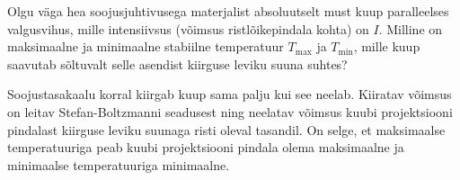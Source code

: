 
Olgu väga hea soojusjuhtivusega materjalist absoluutselt must kuup paralleelses valgusvihus, mille intensiivsus (võimsus ristlõikepindala kohta) on $I$. Milline on maksimaalne ja minimaalne stabiilne temperatuur $T_\text{max}$ ja $T_\text{min}$, mille kuup saavutab sõltuvalt selle asendist kiirguse leviku suuna suhtes?

\hint
Soojustasakaalu korral kiirgab kuup sama palju kui see neelab. Kiiratav võimsus on leitav Stefan-Boltzmanni seadusest ning neelatav võimsus kuubi projektsiooni pindalast kiirguse leviku suunaga risti oleval tasandil. On selge, et maksimaalse temperatuuriga peab kuubi projektsiooni pindala olema maksimaalne ja minimaalse temperatuuriga minimaalne.


